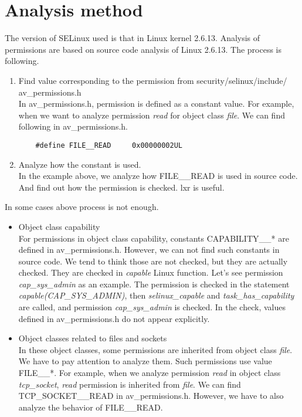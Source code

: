 \documentclass{article}
\begin{document}
\section{Analysis method}
The version of SELinux used is that in Linux kernel 2.6.13. Analysis of permissions are based on source code analysis
of Linux 2.6.13.  The process is following.
\begin{enumerate}
 \item  Find value corresponding to the permission from
	security/selinux/include/ av\_permissions.h\\
	In av\_permissions.h, permission is defined as a constant
	value. For example, when we want to analyze permission {\it
	read} for object class {\it file}. 
	We can find following in av\_permissions.h.
	\begin{verbatim}
	#define FILE__READ     0x00000002UL		
	\end{verbatim}
 \item  Analyze how the constant is used.\\
	In the example above, we analyze how FILE\_\_READ is used in
	source code. And find out how the permission is checked. 
	lxr \cite{lxr} is useful. 
\end{enumerate}
In some cases above process is not enough. 
\begin{itemize}
 \item Object class capability\\
       For permissions in object class capability, constants
       CAPABILITY\_\_* are defined in av\_permissions.h. However, we can
       not find such constants in source code. We tend to think those
       are not checked, but they are
       actually checked. They are checked in {\it capable} Linux
       function. Let's see permission {\it cap\_sys\_admin} as an
       example. The permission is checked in the statement {\it
       capable(CAP\_SYS\_ADMIN)}, then {\it selinux\_capable} and
       {\it task\_has\_capability} are called, and permission 
       {\it cap\_sys\_admin} is checked. In the check, values defined in
       av\_permissions.h do not appear explicitly.
 \item Object classes related to files and sockets\\
       In these object classes, some permissions are inherited from
       object class {\it file}. 
       We have to pay attention to analyze them. Such permissions
       use value FILE\_\_*.  
       For example, when we analyze permission {\it read} in object
       class {\it tcp\_socket}, {\it read } permission is inherited
       from {\it file}. We can find TCP\_SOCKET\_\_READ in
       av\_permissions.h. However, we have to also analyze the behavior
       of FILE\_\_READ. 
\end{itemize}
\end{document}
